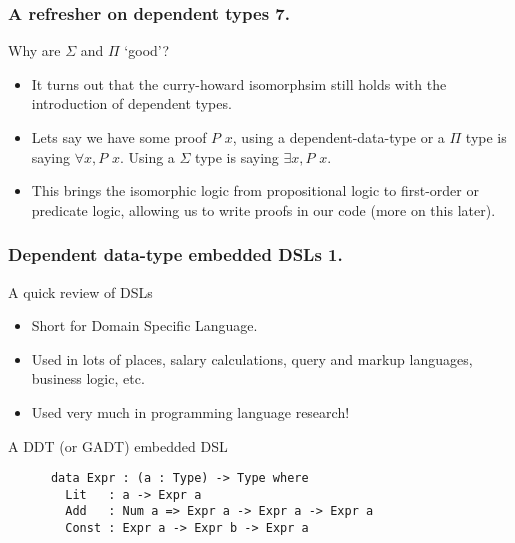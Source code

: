 \documentclass{beamer}
\begin{document}
\begin{frame}[fragile]
  \frametitle{A refresher on dependent types 7.}
  \begin{block}{Why are $\Sigma$ and $\Pi$ `good'?}
  \begin{itemize}
    \item It turns out that the curry-howard isomorphsim
      still holds with the introduction of dependent types.
    \item Lets say we have some proof $P$ $x$, using a
      dependent-data-type or a $\Pi$ type is saying $\forall x, P$ $x$.
      Using a $\Sigma$ type is saying $\exists x, P$ $x$.
    \item This brings the isomorphic logic from propositional logic
      to first-order or predicate logic, allowing us to write proofs
      in our code (more on this later).
  \end{itemize}
  \end{block}
\end{frame}

\begin{frame}[fragile]
  \frametitle{Dependent data-type embedded DSLs 1.}
  \begin{block}{A quick review of DSLs}
    \begin{itemize}
      \item Short for Domain Specific Language.
      \item Used in lots of places, salary calculations, query and
        markup languages, business logic, etc.
      \item Used very much in programming language research!
    \end{itemize}
  \end{block}
  \begin{block}{A DDT (or GADT) embedded DSL}
    \begin{verbatim}
      data Expr : (a : Type) -> Type where
        Lit   : a -> Expr a
        Add   : Num a => Expr a -> Expr a -> Expr a
        Const : Expr a -> Expr b -> Expr a
    \end{verbatim}
  \end{block}
\end{frame}
\end{document}
